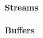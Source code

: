 \documentclass{memo}
\begin{document}
\small
{}

\paragraph{Streams}
\paragraph{Buffers}
\end{document}
